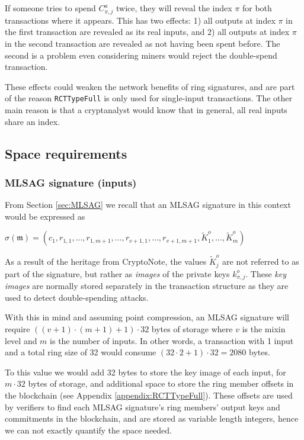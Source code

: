 If someone tries to spend $C^a_{\pi,j}$ twice, they will reveal the index $\pi$ for both transactions where it appears. This has two effects: 1) all outputs at index $\pi$ in the first transaction are revealed as its real inputs, and 2) all outputs at index $\pi$ in the second transaction are revealed as not having been spent before. The second is a problem even considering miners would reject the double-spend transaction.

These effects could weaken the network benefits of ring signatures, and are part of the reason {\tt RCTTypeFull} is only used for single-input transactions. The other main reason is that a cryptanalyst would know that in general, all real inputs share an index.


\subsection{Space requirements}

\subsubsection*{MLSAG signature (inputs)}

From Section \ref{sec:MLSAG} we recall that an MLSAG signature in this context would be expressed as

\hfill \(\sigma(\mathfrak{m}) = (c_1, r_{1, 1}, ..., r_{1, m+1}, ..., r_{v+1, 1}, ..., r_{v+1, m+1}, \tilde{K}^o_1, ..., \tilde{K}^o_m) \) \hfill \phantom{.}

As a result of the heritage from CryptoNote, the values \(\tilde{K}^o_j\) are not referred to as part of the signature, but rather as {\em images} of the private keys $k^o_{\pi,j}$. These {\em key images} are normally stored separately in the transaction structure as they are used to detect double-spending attacks.

With this in mind and assuming point compression, an MLSAG signature will require $((v + 1) \cdot (m + 1) + 1) \cdot 32$ bytes of storage where $v$ is the mixin level and $m$ is the number of inputs. In other words, a transaction with 1 input and a total ring size of 32 would consume $(32 \cdot 2 + 1) \cdot 32 = 2080$ bytes.

To this value we would add 32 bytes to store the key image of each input, for $m \cdot 32$ bytes of storage, and additional space to store the ring member offsets in the blockchain (see Appendix \ref{appendix:RCTTypeFull}). These offsets are used by verifiers to find each MLSAG signature's ring members' output keys and commitments in the blockchain, and are stored as variable length integers, hence we can not exactly quantify the space needed.


